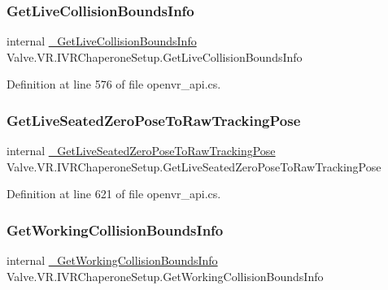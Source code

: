 \subsubsection{\texorpdfstring{GetLiveCollisionBoundsInfo}{GetLiveCollisionBoundsInfo}}
{\footnotesize\ttfamily internal \mbox{\hyperlink{struct_valve_1_1_v_r_1_1_i_v_r_chaperone_setup_a1f35059b49dd3cdeee5e782176b0d086}{\+\_\+\+Get\+Live\+Collision\+Bounds\+Info}} Valve.\+V\+R.\+I\+V\+R\+Chaperone\+Setup.\+Get\+Live\+Collision\+Bounds\+Info}



Definition at line 576 of file openvr\+\_\+api.\+cs.

\mbox{\label{struct_valve_1_1_v_r_1_1_i_v_r_chaperone_setup_a0639c1537c42116c7948ce51472da542}} 
\subsubsection{\texorpdfstring{GetLiveSeatedZeroPoseToRawTrackingPose}{GetLiveSeatedZeroPoseToRawTrackingPose}}
{\footnotesize\ttfamily internal \mbox{\hyperlink{struct_valve_1_1_v_r_1_1_i_v_r_chaperone_setup_a2e6aaeb62d03003acf2b93f46f82c0cf}{\+\_\+\+Get\+Live\+Seated\+Zero\+Pose\+To\+Raw\+Tracking\+Pose}} Valve.\+V\+R.\+I\+V\+R\+Chaperone\+Setup.\+Get\+Live\+Seated\+Zero\+Pose\+To\+Raw\+Tracking\+Pose}



Definition at line 621 of file openvr\+\_\+api.\+cs.

\mbox{\label{struct_valve_1_1_v_r_1_1_i_v_r_chaperone_setup_aa9d181aa9ae28db9b6d05c55e3f2066b}} 
\subsubsection{\texorpdfstring{GetWorkingCollisionBoundsInfo}{GetWorkingCollisionBoundsInfo}}
{\footnotesize\ttfamily internal \mbox{\hyperlink{struct_valve_1_1_v_r_1_1_i_v_r_chaperone_setup_ad1822f8ee3c4421e27175ae83ca0c7d9}{\+\_\+\+Get\+Working\+Collision\+Bounds\+Info}} Valve.\+V\+R.\+I\+V\+R\+Chaperone\+Setup.\+Get\+Working\+Collision\+Bounds\+Info}



